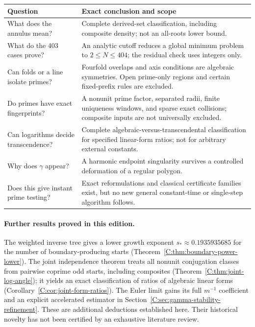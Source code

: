 \documentclass[11pt,a4paper]{article}
\theoremstyle{definition}
\theoremstyle{remark}
\numberwithin{equation}{section}
\begin{document}
\begin{center}\small
\begin{tabular}{@{}>{\raggedright\arraybackslash}p{.27\linewidth}>{\raggedright\arraybackslash}p{.65\linewidth}@{}}
\toprule
Question & Exact conclusion and scope\\
\midrule
What does the annulus mean? & Complete derived-set classification, including composite density; not an all-roots lower bound.\\[3pt]
What do the 403 cases prove? & An analytic cutoff reduces a global minimum problem to $2\le N\le404$; the residual check uses integers only.\\[3pt]
Can folds or a line isolate primes? & Fourfold overlaps and axis conditions are algebraic symmetries. Open prime-only regions and certain fixed-prefix rules are excluded.\\[3pt]
Do primes have exact fingerprints? & A nonunit prime factor, separated radii, finite uniqueness windows, and sparse exact collisions; composite inputs are not universally excluded.\\[3pt]
Can logarithms decide transcendence? & Complete algebraic-versus-transcendental classification for specified linear-form ratios; not for arbitrary external constants.\\[3pt]
Why does $\gamma$ appear? & A harmonic endpoint singularity survives a controlled deformation of a regular polygon.\\[3pt]
Does this give instant prime testing? & Exact reformulations and classical certificate families exist, but no new general constant-time or single-step algorithm follows.\\
\bottomrule
\end{tabular}
\end{center}

\paragraph{Further results proved in this edition.}
The weighted inverse tree gives a lower growth exponent
$s_*\approx0.1935935685$ for the number of boundary-producing starts
(Theorem~\ref{C:thm:boundary-power-lower}).
The joint independence theorem treats all nonunit conjugation classes
from pairwise coprime odd starts, including composites
(Theorem~\ref{C:thm:joint-log-angle}); it yields an exact classification
of ratios of algebraic linear forms
(Corollary~\ref{C:cor:joint-form-ratios}).
The Euler limit gains its full $m^{-1}$ coefficient and an explicit
accelerated estimator in Section~\ref{C:sec:gamma-stability-refinement}.
These are additional deductions established here. Their historical
novelty has not been certified by an exhaustive literature review.
\end{document}
